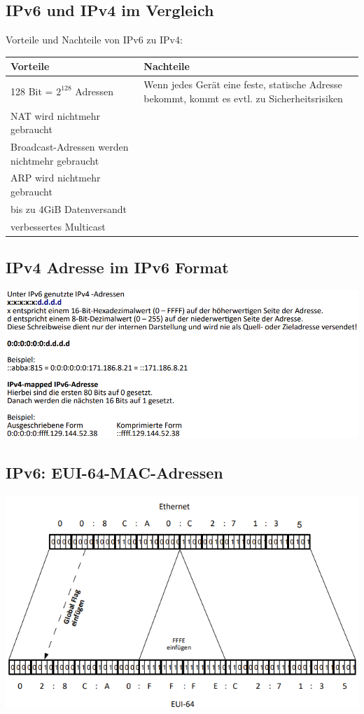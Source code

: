 \documentclass[12pt,a4paper]{article}
\begin{document}
		\newpage
		\subsection{IPv6 und IPv4 im Vergleich}
			Vorteile und Nachteile von IPv6 zu IPv4:
			\begin{table}[h]
				\renewcommand{\arraystretch}{1.5}
				\begin{tabularx}{17cm}{|X|X|}
					\hline
					\cellcolor{cyan!60}Vorteile&\cellcolor{cyan!60}Nachteile\\
					\hline
					\hline
					128 Bit = $\text{2}^{\text{128}}$ Adressen&Wenn jedes Gerät eine feste, statische Adresse bekommt, kommt es evtl. zu Sicherheitsrisiken \\
					\hline
					NAT wird nichtmehr gebraucht& \\
					\hline
					Broadcast-Adressen werden nichtmehr gebraucht& \\
					\hline
					ARP wird nichtmehr gebraucht& \\
					\hline
					bis zu 4GiB Datenversandt& \\
					\hline
					verbessertes Multicast& \\
					\hline
				\end{tabularx}
			\end{table}   

		\subsection{IPv4 Adresse im IPv6 Format}
		\includegraphics[width=\textwidth]{Bilder/v4-in-v6.PNG}

		\subsection{IPv6: EUI-64-MAC-Adressen}
		\includegraphics[width=\textwidth]{Bilder/ipv6-mac.PNG}
			
\end{document}
